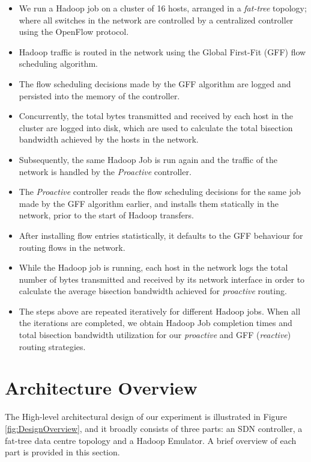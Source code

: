 \begin{itemize}
	\item We run a Hadoop job on a cluster of 16 hosts, arranged in a \textit{fat-tree} \cite{al2008scalable} topology; where all switches in the network are controlled by a centralized controller using the OpenFlow \cite{mckeown2008openflow} protocol.
	\item Hadoop traffic is routed in the network using the Global First-Fit (GFF) \cite{al2010hedera} flow scheduling algorithm.
	\item The flow scheduling decisions made by the GFF algorithm are logged and persisted into the memory of the controller. 
	\item Concurrently, the total bytes transmitted and received by each host in the cluster are logged into disk, which are used to calculate the total bisection bandwidth achieved by the hosts in the network. 
	\item Subsequently, the same Hadoop Job is run again and the traffic of the network is handled by the \textit{Proactive} controller.
	\item The \textit{Proactive} controller reads the flow scheduling decisions for the same job made by the GFF algorithm earlier, and installs them statically in the network, prior to the start of Hadoop transfers.
	\item After installing flow entries statistically, it defaults to the GFF behaviour for routing flows in the network.  
	\item While the Hadoop job is running, each host in the network logs the total number of bytes transmitted and received by its network interface in order to calculate the average bisection bandwidth achieved for \textit{proactive} routing.
	\item The steps above are repeated iteratively for different Hadoop jobs. When all the iterations are completed, we obtain Hadoop Job completion times and  total bisection bandwidth utilization for our \textit{proactive} and GFF (\textit{reactive}) routing strategies.   
\end{itemize}

\section{Architecture Overview} \label{sec:DOverview}
The High-level architectural design of our experiment is illustrated in Figure \ref{fig:DesignOverview}, and it broadly consists of three parts: an SDN controller, a fat-tree data centre topology and a Hadoop Emulator. A brief overview of each part is provided in this section.
 
